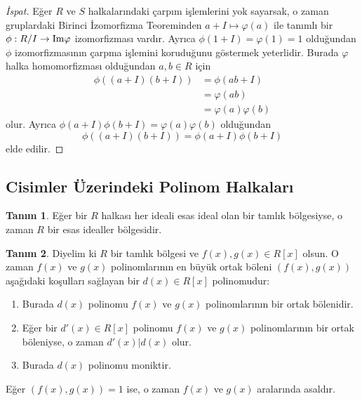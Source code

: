 \documentclass{article}
\theoremstyle{definition}
\newtheorem{defn}{Tanım}[section]
\theoremstyle{remark}
\begin{document}
    		\begin{proof}[İspat]
    		    Eğer $R$ ve $S$ halkalarındaki çarpım işlemlerini yok sayarsak, o zaman gruplardaki Birinci İzomorfizma Teoreminden $a + I \mapsto \varphi(a)$ ile tanımlı bir $\phi: R/I \to \textup{Im}\varphi$ izomorfizması vardır. Ayrıca $\phi(1 + I) = \varphi(1) = 1$ olduğundan $\phi$ izomorfizmasının çarpma işlemini koruduğunu göstermek yeterlidir. Burada $\varphi$ halka homomorfizması olduğundan $a, b \in R$ için
    		    \begin{align*}
    		        \phi((a + I)(b + I)) &= \phi(ab + I)\\
    		        &= \varphi(ab)\\
    		        &= \varphi(a)\varphi(b)
    		    \end{align*}
    		    olur. Ayrıca $\phi(a + I)\phi(b + I) = \varphi(a)\varphi(b)$ olduğundan
    		    \begin{equation*}
    		        \phi((a + I)(b + I)) = \phi(a + I)\phi(b + I)
    		    \end{equation*}
    		    elde edilir.
    		\end{proof}
    		
    	\subsection{Cisimler Üzerindeki Polinom Halkaları}
    		
    		\begin{defn}
    		    Eğer bir $R$ halkası her ideali esas ideal olan bir tamlık bölgesiyse, o zaman $R$ bir esas idealler bölgesidir.
    		\end{defn}
    		
    		\begin{defn}
    		    Diyelim ki $R$ bir tamlık bölgesi ve $f(x), g(x) \in R[x]$ olsun. O zaman $f(x)$ ve $g(x)$ polinomlarının en büyük ortak böleni $(f(x), g(x))$ aşağıdaki koşulları sağlayan bir $d(x) \in R[x]$ polinomudur:
    			\begin{enumerate}	\renewcommand{\labelenumi}{(\roman{enumi})}
    				\item Burada $d(x)$ polinomu $f(x)$ ve $g(x)$ polinomlarının bir ortak bölenidir.
    				\item Eğer bir $d'(x) \in R[x]$ polinomu $f(x)$ ve $g(x)$ polinomlarının bir ortak böleniyse, o zaman $d'(x) | d(x)$ olur.
    				\item Burada $d(x)$ polinomu moniktir.
    			\end{enumerate}\par
    			Eğer $(f(x), g(x)) = 1$ ise, o zaman $f(x)$ ve $g(x)$ aralarında asaldır.
    		\end{defn}
    		
\end{document}
